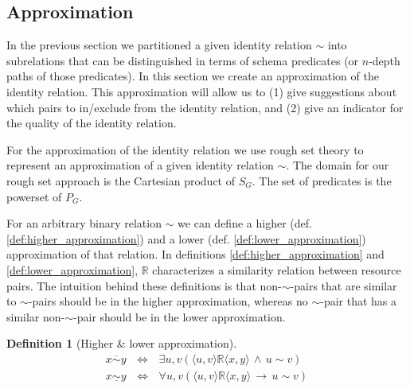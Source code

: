 \documentclass[letterpaper]{article}
\newtheorem{definition}{Definition}
\newcommand{\pair}[2]{\langle#1,#2\rangle}
\begin{document}
\subsection{Approximation}
\label{sec:approximation}

In the previous section we partitioned a given identity relation $\sim$
  into subrelations that can be distinguished in terms of schema predicates
  (or $n$-depth paths of those predicates).
In this section we create an approximation of the identity relation.
This approximation will allow us to
  (1) give suggestions about which pairs to in/exclude from
      the identity relation, and
  (2) give an indicator for the quality of the identity relation.

For the approximation of the identity relation we use
  rough set theory \cite{pawlak_1991} to represent an approximation of
  a given identity relation $\sim$.
The domain for our rough set approach is the Cartesian product of $S_G$.
The set of predicates is the powerset of $P_G$.

For an arbitrary binary relation $\sim$ we can define
  a higher (def. \ref{def:higher_approximation}) and
  a lower (def. \ref{def:lower_approximation}) approximation
  of that relation.
In definitions \ref{def:higher_approximation} and
  \ref{def:lower_approximation},
  $\mathbb{R}$ characterizes a similarity relation between resource pairs.
The intuition behind these definitions is that non-$\sim$-pairs
  that are similar to $\sim$-pairs should be in the higher approximation,
  whereas no $\sim$-pair that has a similar non-$\sim$-pair should be
  in the lower approximation.

\small
\begin{definition}[Higher \& lower approximation]
\begin{align}
\label{def:higher_approximation}
x \overline{\sim} y \, & \iff & \,
  \exists u,v (\pair{u}{v} \mathbb{R} \pair{x}{y} \,\land\, u \sim v)
\\
\label{def:lower_approximation}
x \underline{\sim} y \, & \iff & \,
  \forall u,v (\pair{u}{v} \mathbb{R} \pair{x}{y} \,\rightarrow\, u \sim v)
\end{align}
\end{definition}
\normalsize 
\end{document}

